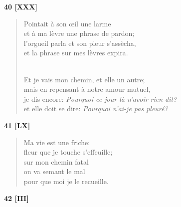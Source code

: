 \documentclass[a4paper,11pt]{book}
\begin{document}
\bigskip

\begin{center} {\bf 40 [XXX]} \end{center}

\begin{verse}
Pointait à son {\oe}il une larme \\
et à ma lèvre une phrase de pardon; \\
l'orgueil parla et son pleur s'assècha, \\
et la phrase sur mes lèvres expira. \\ \


Et je vais mon chemin, et elle un autre; \\
mais en repensant à notre amour mutuel, \\
je dis encore: {\em Pourquoi ce jour-là n'avoir rien dit?} \\
et elle doit se dire: {\em Pourquoi n'ai-je pas pleuré?} \\
\end{verse}

\bigskip

\begin{center} {\bf 41 [LX]} \end{center}

\begin{verse}
Ma vie est une friche: \\
fleur que je touche s'effeuille; \\
sur mon chemin fatal \\
on va semant le mal \\
pour que moi je le recueille. \\
\end{verse}

\bigskip

\begin{center} {\bf 42 [III]} \end{center}
\end{document}
